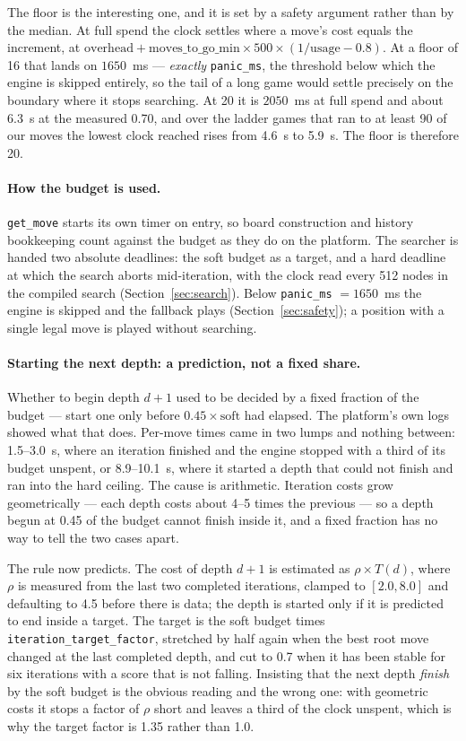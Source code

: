 \documentclass[11pt,a4paper]{article}
\newcommand{\code}[1]{\texttt{#1}}
\begin{document}
The floor is the interesting one, and it is set by a safety argument rather than by the median. At full
spend the clock settles where a move's cost equals the increment, at $\mathrm{overhead} +
\mathrm{moves\_to\_go\_min} \times 500 \times (1/\mathrm{usage} - 0.8)$. At a floor of 16 that lands on
$1650$~ms --- \emph{exactly} \code{panic\_ms}, the threshold below which the engine is skipped entirely,
so the tail of a long game would settle precisely on the boundary where it stops searching. At 20 it is
$2050$~ms at full spend and about 6.3~s at the measured 0.70, and over the ladder games that ran to at
least 90 of our moves the lowest clock reached rises from 4.6~s to 5.9~s. The floor is therefore 20.

\paragraph{How the budget is used.} \code{get\_move} starts its own timer on entry, so board construction
and history bookkeeping count against the budget as they do on the platform. The searcher is handed two
absolute deadlines: the soft budget as a target, and a hard deadline at which the search aborts
mid-iteration, with the clock read every 512 nodes in the compiled search (Section~\ref{sec:search}).
Below \code{panic\_ms} $= 1650$~ms the engine is skipped and the fallback plays
(Section~\ref{sec:safety}); a position with a single legal move is played without searching.

\paragraph{Starting the next depth: a prediction, not a fixed share.} Whether to begin depth $d+1$ used to
be decided by a fixed fraction of the budget --- start one only before $0.45 \times \mathrm{soft}$ had
elapsed. The platform's own logs showed what that does. Per-move times came in two lumps and nothing
between: 1.5--3.0~s, where an iteration finished and the engine stopped with a third of its budget unspent,
or 8.9--10.1~s, where it started a depth that could not finish and ran into the hard ceiling. The cause is
arithmetic. Iteration costs grow geometrically --- each depth costs about 4--5 times the previous --- so a
depth begun at 0.45 of the budget cannot finish inside it, and a fixed fraction has no way to tell the two
cases apart.

The rule now predicts. The cost of depth $d+1$ is estimated as $\rho \times T(d)$, where $\rho$ is
measured from the last two completed iterations, clamped to $[2.0, 8.0]$ and defaulting to 4.5 before
there is data; the depth is started only if it is predicted to end inside a target. The target is the soft
budget times \code{iteration\_target\_factor}, stretched by half again when the best root move changed at
the last completed depth, and cut to 0.7 when it has been stable for six iterations with a score that is
not falling. Insisting that the next depth \emph{finish} by the soft budget is the obvious reading and the
wrong one: with geometric costs it stops a factor of $\rho$ short and leaves a third of the clock unspent,
which is why the target factor is 1.35 rather than 1.0.
\end{document}
